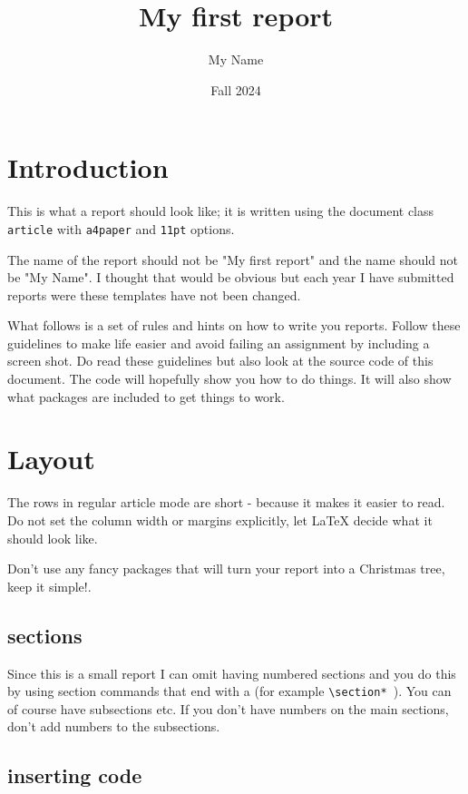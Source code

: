 \documentclass[a4paper,11pt]{article}
\begin{document}
\title{
    \textbf{My first report}
}
\author{My Name}
\date{Fall 2024}

\maketitle

\section*{Introduction}

This is what a report should look like; it is written using the
document class {\tt article} with {\tt a4paper} and {\tt 11pt}
options.

The name of the report should not be "My first report" and the name
should not be "My Name". I thought that would be obvious but each year
I have submitted reports were these templates have not been changed. 

What follows is a set of rules and hints on how to write you
reports. Follow these guidelines to make life easier and avoid failing
an assignment by including a screen shot. Do read these guidelines but
also look at the source code of this document. The code will hopefully
show you how to do things. It will also show what packages are
included to get things to work.

\section*{Layout}

The rows in regular article mode are short - because it makes it
easier to read. Do not set the column width or margins explicitly, let
LaTeX decide what it should look like.

Don't use any fancy packages that will turn your report into a
Christmas tree, keep it simple!.

\subsection*{sections}

Since this is a small report I can omit having numbered sections and
you do this by using section commands that end with a {\tt *} (for
example {\tt \textbackslash section* }). You can of course have
subsections etc. If you don't have numbers on the main sections,
don't add numbers to the subsections.


\subsection*{inserting code}
\end{document}
